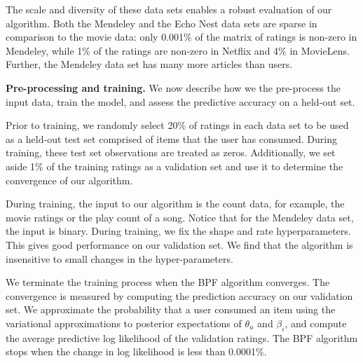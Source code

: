 The scale and diversity of these data sets enables a robust evaluation
of our algorithm. Both the Mendeley and the Echo Nest data sets are
sparse in comparison to the movie data: only 0.001\% of the matrix of
ratings is non-zero in Mendeley, while 1\% of the ratings are non-zero
in Netflix and 4\% in MovieLens. Further, the Mendeley data set has
many more articles than users.





{\bf Pre-processing and training.} We now describe how we the
pre-process the input data, train the model, and assess the predictive
accuracy on a held-out set.

Prior to training, we randomly select 20\% of ratings in each data set
to be used as a held-out test set comprised of items that the user
has consumed. During training, these test set observations are treated
as zeros. Additionally, we set aside 1\% of the training ratings as a
validation set and use it to determine the convergence of our
algorithm.

During training, the input to our algorithm is the count data, for
example, the movie ratings or the play count of a song. Notice that
for the Mendeley data set, the input is binary. During training, we
fix the shape and rate hyperparameters. This gives good performance on
our validation set. We find that the algorithm is insensitive to small
changes in the hyper-parameters.


We terminate the training process when the BPF algorithm
converges. The convergence is measured by computing the prediction
accuracy on our validation set. We approximate the probability that a
user consumed an item using the variational approximations to
posterior expectations of $\theta_u$ and $\beta_i$, and compute the
average predictive log likelihood of the validation ratings. The BPF
algorithm stops when the change in log likelihood is less than
0.0001\%.

